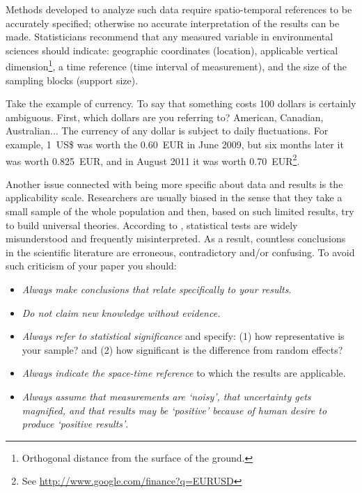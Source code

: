 \documentclass[graybox,envcountchap,sectrefs,UStrade]{svmono}
\begin{document}
Methods developed to analyze such data require spatio-temporal references to be accurately specified; otherwise no accurate interpretation of the results can be made. Statisticians recommend that any measured variable in environmental sciences should indicate: geographic coordinates (location), applicable vertical dimension\footnote{Orthogonal distance from the surface of the ground.}, a time reference (time interval of measurement), and the size of the sampling blocks (support size).\par

Take the example of currency. To say that something costs 100 dollars is certainly ambiguous. First, which dollars are you referring to? American, Canadian, Australian$\ldots$ The currency of any dollar is subject to daily fluctuations. For example, 1~US\$ was worth the 0.60~EUR in June 2009, but six months later it was worth 0.825~EUR, and in August 2011 it was worth 0.70~EUR\footnote{See \url{http://www.google.com/finance?q=EURUSD}}. \par

Another issue connected with being more specific about data and results is the applicability scale. Researchers are usually biased in the sense that they take a small sample of the whole population and then, based on such limited results, try to build universal theories. According to \citet{Siegfried2010SN}, statistical tests are widely misunderstood and frequently misinterpreted. As a result, countless conclusions in the scientific literature are erroneous, contradictory and/or confusing. To avoid such criticism of your paper you should:

\begin{itemize}
  \item \emph{Always make conclusions that relate specifically to your results}.
  \item \emph{Do not claim new knowledge without evidence.}
  \item \emph{Always refer to statistical significance} and specify: (1) how representative is your sample? and (2) how significant is the difference from random effects?
  \item \emph{Always indicate the space-time reference} to which the results are applicable.
  \item \emph{Always assume that measurements are `noisy', that uncertainty gets magnified, and that results may be `positive' because of human desire to produce `positive results'}.
\end{itemize}
\end{document}
